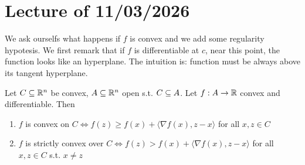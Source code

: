 \chapter{Lecture \thechapter{} of 11/03/2026}

We ask ourselfs what happens if $f$ is convex and we add some regularity hypotesis. We first remark that if $f$ is differentiable at $c$, near this point, the function looks like an hyperplane. The intuition is: function must be always above its tangent hyperplane.

\begin{proposition}[Book 1.1.7]
    
    Let $C \subseteq {\mathbb{R}^n}$ be convex, $A \subseteq {\mathbb{R}^n}$ open s.t. $C \subseteq A$. Let $f: A \to \mathbb{R}$ convex and differentiable. Then 

    \begin{enumerate}
        \item[$i)$] $f$ is convex on $C \iff f(z) \ge f(x) + \langle \nabla f(x), z - x \rangle$ for all $x,z \in C$
        \item[$ii)$] $f$ is strictly convex over $C \iff f(z) > f(x) + \langle \nabla f(x), z-x \rangle$ for all $x,z \in C$ s.t. $x \neq z$
    \end{enumerate}

\end{proposition}

